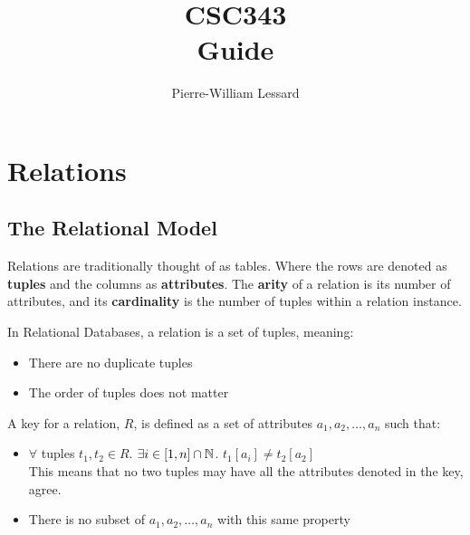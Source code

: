 \documentclass{report}
\title{\Huge{CSC343}\\Guide}
\author{\huge{Pierre-William Lessard}}
\date{}
\begin{document}
    \maketitle
    \newpage
    \tableofcontents
    \pagebreak



    \chapter{Relations}
    \section{The Relational Model}

    \vspace{.5cm}

    \par Relations are traditionally thought of as tables. Where the rows are denoted as \textbf{tuples} and the columns as \textbf{attributes}. The \textbf{arity} of a relation is its number of attributes, and its \textbf{cardinality} is the number of tuples within a relation instance. \\
    
    \par In Relational Databases, a relation is a set of tuples, meaning: 
    \begin{itemize}
        \item There are no duplicate tuples
        \item The order of tuples does not matter
    \end{itemize} 
\vspace{.5cm}
 
    {
        A key for a relation, $R$, is defined as a set of attributes $a_1, a_2, \dots, a_n$ such that:
        \begin{itemize}
            \item $\forall$ tuples $t_1, t_2 \in R$. $\exists i \in [1,n]\cap \mathbb{N}$. $t_1 [a_i] \neq t_2 [a_2] $ \\
            This means that no two tuples may have all the attributes denoted in the key, agree. 

            \item There is no subset of $a_1, a_2, \dots, a_n$ with this same property
            
        \end{itemize}
    } \vspace{.5cm}
     
\end{document}
